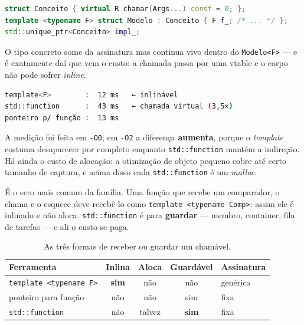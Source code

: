 \begin{lstlisting}[style=bt, language=C++,
    caption={O esqueleto do \emph{type erasure}.}]
struct Conceito { virtual R chamar(Args...) const = 0; };
template <typename F> struct Modelo : Conceito { F f_; /* ... */ };
std::unique_ptr<Conceito> impl_;
\end{lstlisting}

O tipo concreto some da assinatura mas continua vivo dentro do
\texttt{Modelo<F>} --- e é exatamente daí que vem o custo: a chamada passa por
uma \gls{vtable} e o corpo não pode sofrer \emph{inline}.

\begin{lstlisting}[style=bt, language=bash,
    caption={Saída de \texttt{src/lambdas/}: 2 milhões de elementos.}]
template<F>        :  12 ms   ← inlinável
std::function      :  43 ms   ← chamada virtual (3,5×)
ponteiro p/ função :  13 ms
\end{lstlisting}

A medição foi feita em \texttt{-O0}; em \texttt{-O2} a diferença
\textbf{aumenta}, porque o \emph{template} costuma desaparecer por completo
enquanto \texttt{std::function} mantém a indireção. Há ainda o custo de
alocação: a otimização de objeto pequeno cobre até certo tamanho de captura, e
acima disso cada \texttt{std::function} é um \emph{malloc}.

\begin{regra}
É o erro mais comum da família. Uma função que recebe um comparador, o chama e o
esquece deve recebê-lo como \texttt{template <typename Comp>}: assim ele é
inlinado e não aloca. \texttt{std::function} é para \textbf{guardar} ---
membro, container, fila de tarefas --- e ali o custo se paga.
\end{regra}

\begin{table}[htbp]
\centering
\caption{As três formas de receber ou guardar um chamável.}
\label{tab:chamaveis-custo}
\footnotesize
\begin{tabular}{@{}lcccl@{}}
\toprule
\textbf{Ferramenta} & \textbf{Inlina} & \textbf{Aloca} & \textbf{Guardável} & \textbf{Assinatura} \\
\midrule
\texttt{template <typename F>} & \textbf{sim} & não    & não          & genérica \\
ponteiro para função           & não          & não    & sim          & fixa \\
\texttt{std::function}         & não          & talvez & \textbf{sim} & fixa \\
\bottomrule
\end{tabular}
\end{table}

